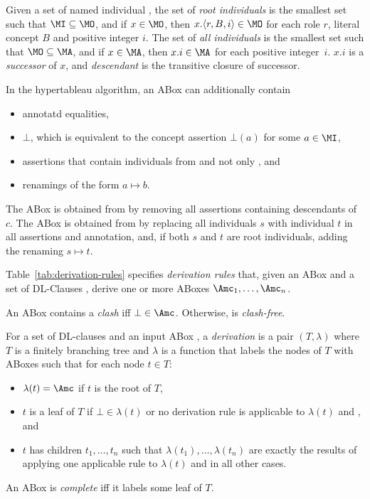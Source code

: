\begin{definition}
  Given a set of named individual \MI, the set of \emph{root individuals \MO} is the smallest set
  such that $\MI\subseteq\MO$, and if $x\in\MO$, then $x.\langle r,B,i \rangle\in\MO$ for each role
  $r$, literal concept $B$ and positive integer $i$. The set of \emph{all individuals} \MA is the
  smallest set such that $\MO\subseteq\MA$, and if $x\in\MA$, then $x.i\in\MA$ for each positive
  integer~$i$. $x.i$ is a \emph{successor} of $x$, and \emph{descendant} is the transitive closure
  of successor.

  In the hypertableau algorithm, an ABox can additionally contain
  \begin{itemize}
  \item annotatd equalities,
  \item $\bot$, which is equivalent to the concept assertion $\bot(a)$ for some $a\in\MI$,
  \item assertions that contain individuals from \MA and not only \MI, and
  \item renamings of the form $a\mapsto b$.
  \end{itemize}
  The ABox \emph{} is obtained from \A by removing all assertions containing
  descendants of~$c$.  The ABox \emph{} is obtained from  by
  replacing all individuals $s$ with individual $t$ in all assertions and annotation, and, if both
  $s$ and $t$ are root individuals, adding the renaming $s\mapsto t$.

  Table~\ref{tab:derivation-rules} specifies \emph{derivation rules} that, given an ABox \A and a
  set of DL-Clauses \Cmc, derive one or more ABoxes $\A_{1},\dots,\A_{n}$.

  An ABox \A contains a \emph{clash} iff $\bot\in\A$. Otherwise, \A is \emph{clash-free}. 
  
  For a set of DL-clauses \Cmc and an input ABox \A, a \emph{derivation} is a pair $(T,\lambda)$
  where $T$ is a finitely branching tree and $\lambda$ is a function that labels the nodes of $T$
  with ABoxes such that for each node $t\in T$:
  \begin{itemize}
  \item $\lambda(t)=\A$ if $t$ is the root of $T$,
  \item $t$ is a leaf of $T$ if $\bot\in\lambda(t)$ or no derivation rule is applicable to
    $\lambda(t)$ and \Cmc, and
  \item $t$ has children $t_{1},\dots,t_{n}$ such that $\lambda(t_{1}),\dots,\lambda(t_{n})$ are
    exactly the results of applying one applicable rule to $\lambda(t)$ and \Cmc in all other
    cases.
  \end{itemize}
  An ABox is \emph{complete} iff it labels some leaf of $T$.
\end{definition}

